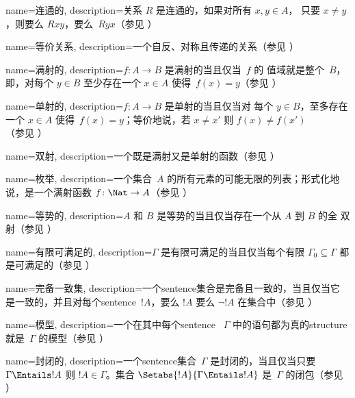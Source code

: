  {
  name=连通的,
  description={关系 $R$ 是连通的，如果对所有 $x, y\in A$，
    只要 $x \neq y$，则要么 $Rxy$，要么~$Ryx$（参见
    ）} }

 {
  name={等价关系}, 
  description={一个自反、对称且传递的关系（参见
    ）} }

 {
  name={满射的},
  description={$f \colon A \to B$ 是满射的当且仅当~$f$ 的
    值域就是整个~$B$，即，对每个 $y \in B$ 至少存在一个 $x \in A$ 使得~$f(x) = y$（参见
    ）} }

 {
  name={单射的}, 
  description={$f \colon A \to B$ 是单射的当且仅当对
    每个 $y \in B$，至多存在一个 $x \in A$ 使得~$f(x) =
    y$；等价地说，若 $x \neq x'$ 则 $f(x) \neq f(x')$
    （参见 ）} }

 {
  name={双射},  
  description={一个既是满射又是单射的函数（参见 ）} }

 {
  name=枚举,  
  description={一个集合~$A$ 的所有元素的可能无限的列表；形式化地说，是一个满射函数
    $f\colon \Nat \to A$（参见 ）} }

 {
  name=等势的,
  description={$A$ 和 $B$ 是等势的当且仅当存在一个从 $A$ 到 $B$ 的全
    双射（参见 ）} }

 {
  name={有限可满足的},  
  description={$\Gamma$ 是有限可满足的当且仅当每个有限
    $\Gamma_0 \subseteq \Gamma$ 都是可满足的（参见
    ）} }

 {
  name=完备一致集,
  description={一个\gls{sentence}集合是完备且一致的，当且仅当它
    是一致的，并且对每个\gls{sentence}~$!A$，要么 $!A$ 要么
    $\lnot !A$ 在集合中（参见 ）} }

 {
  name=模型,  
  description={一个在其中每个\gls{sentence}
    ~$\Gamma$ 中的语句都为真的\gls{structure}就是~$\Gamma$ 的模型（参见
    ）} }

 {
  name=封闭的, 
  description={一个\gls{sentence}集合~$\Gamma$ 是封闭的，当且仅当只要
    $\Gamma \Entails !A$ 则 $!A \in \Gamma$。集合
    $\Setabs{!A}{\Gamma \Entails !A}$ 是~$\Gamma$ 的闭包（参见
    ）} }

